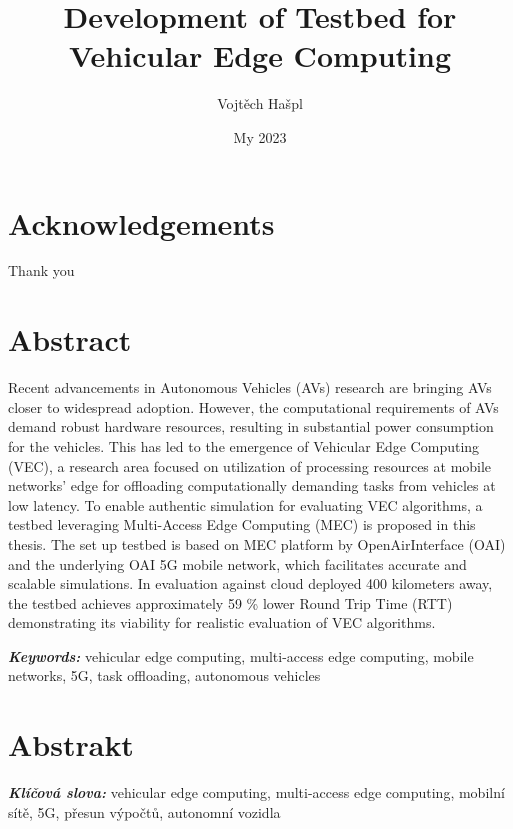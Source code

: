 \documentclass[12pt,a4paper,twoside]{report}
\title {Development of Testbed for Vehicular Edge Computing}
\author{Vojtěch Hašpl}
\date{My 2023}
\providecommand{\keywords}[1]{\vspace{4pt}\textbf{\textit{Keywords: }} #1}
\providecommand{\keywordscz}[1]{\vspace{4pt}\textbf{\textit{Klíčová slova: }} #1}
\begin{document}
\maketitle




\makestatement




\chapter*{Acknowledgements}
	Thank you


\chapter*{Abstract}
Recent advancements in Autonomous Vehicles (AVs) research are bringing AVs closer to widespread adoption. However, the computational requirements of AVs demand robust hardware resources, resulting in substantial power consumption for the vehicles. This has led to the emergence of Vehicular Edge Computing (VEC), a research area focused on utilization of processing resources at mobile networks’ edge for offloading computationally demanding tasks from vehicles at low latency. To enable authentic simulation for evaluating VEC algorithms, a testbed leveraging Multi-Access Edge Computing (MEC) is proposed in this thesis. The set up testbed is based on MEC platform by OpenAirInterface (OAI) and the underlying OAI 5G mobile network, which facilitates accurate and scalable simulations. In evaluation against cloud deployed 400 kilometers away, the testbed achieves approximately 59 \% lower Round Trip Time (RTT) demonstrating its viability for realistic evaluation of VEC algorithms.
	
\keywords{vehicular edge computing, multi-access edge computing, mobile networks, 5G, task offloading, autonomous vehicles}
%
%
\newpage

\chapter*{Abstrakt}
\keywordscz{vehicular edge computing, multi-access edge computing, mobilní sítě, 5G, přesun výpočtů, autonomn\'i vozidla}
%
%
\newpage
\end{document}
